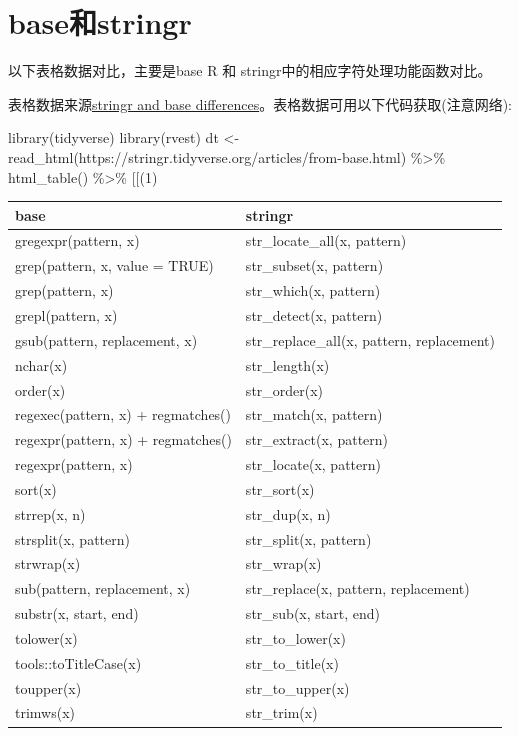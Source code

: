 \documentclass[
]{book}
\newenvironment{Shaded}{\begin{snugshade}}{\end{snugshade}}
\newcommand{\AttributeTok}[1]{\textcolor[rgb]{0.77,0.63,0.00}{#1}}
\newcommand{\DecValTok}[1]{\textcolor[rgb]{0.00,0.00,0.81}{#1}}
\newcommand{\FunctionTok}[1]{\textcolor[rgb]{0.00,0.00,0.00}{#1}}
\newcommand{\NormalTok}[1]{#1}
\newcommand{\OtherTok}[1]{\textcolor[rgb]{0.56,0.35,0.01}{#1}}
\newcommand{\SpecialCharTok}[1]{\textcolor[rgb]{0.00,0.00,0.00}{#1}}
\newcommand{\StringTok}[1]{\textcolor[rgb]{0.31,0.60,0.02}{#1}}
\begin{document}
\hypertarget{character:the-difference-stringr-and-base}{%
\section{base和stringr}\label{character:the-difference-stringr-and-base}}

以下表格数据对比，主要是base R 和 stringr中的相应字符处理功能函数对比。

表格数据来源\href{https://stringr.tidyverse.org/articles/from-base.html}{stringr and base differences}。表格数据可用以下代码获取(注意网络):

\begin{Shaded}
\begin{Highlighting}[]
\FunctionTok{library}\NormalTok{(tidyverse)}
\FunctionTok{library}\NormalTok{(rvest)}
\NormalTok{dt }\OtherTok{\textless{}{-}} \FunctionTok{read\_html}\NormalTok{(}\StringTok{\textquotesingle{}https://stringr.tidyverse.org/articles/from{-}base.html\textquotesingle{}}\NormalTok{) }\SpecialCharTok{\%\textgreater{}\%} 
   \FunctionTok{html\_table}\NormalTok{() }\SpecialCharTok{\%\textgreater{}\%} \StringTok{\textasciigrave{}}\AttributeTok{[[}\StringTok{\textasciigrave{}}\NormalTok{(}\DecValTok{1}\NormalTok{)}
\end{Highlighting}
\end{Shaded}

\begin{longtable}[]{@{}ll@{}}
\toprule
base & stringr \\
\midrule
\endhead
gregexpr(pattern, x) & str\_locate\_all(x, pattern) \\
grep(pattern, x, value = TRUE) & str\_subset(x, pattern) \\
grep(pattern, x) & str\_which(x, pattern) \\
grepl(pattern, x) & str\_detect(x, pattern) \\
gsub(pattern, replacement, x) & str\_replace\_all(x, pattern, replacement) \\
nchar(x) & str\_length(x) \\
order(x) & str\_order(x) \\
regexec(pattern, x) + regmatches() & str\_match(x, pattern) \\
regexpr(pattern, x) + regmatches() & str\_extract(x, pattern) \\
regexpr(pattern, x) & str\_locate(x, pattern) \\
sort(x) & str\_sort(x) \\
strrep(x, n) & str\_dup(x, n) \\
strsplit(x, pattern) & str\_split(x, pattern) \\
strwrap(x) & str\_wrap(x) \\
sub(pattern, replacement, x) & str\_replace(x, pattern, replacement) \\
substr(x, start, end) & str\_sub(x, start, end) \\
tolower(x) & str\_to\_lower(x) \\
tools::toTitleCase(x) & str\_to\_title(x) \\
toupper(x) & str\_to\_upper(x) \\
trimws(x) & str\_trim(x) \\
\bottomrule
\end{longtable}
\end{document}
